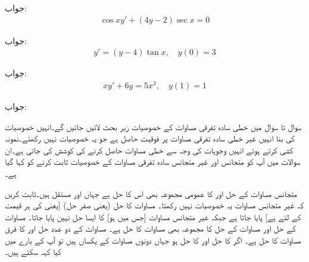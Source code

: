 جواب:
\begin{align*}
\cos x y'+(4y-2)\sec x=0
\end{align*}

جواب:
\begin{align*}
y'=(y-4)\tan x, \quad y(0)=3
\end{align*}

جواب:
\begin{align*}
xy'+6y=5x^3, \quad y(1)=1
\end{align*}

جواب:

سوال  تا سوال  میں خطی سادہ تفرقی مساوات کے خصوصیات زیر بحث لائیں جائیں گے۔انہیں خصوصیات کی بنا انہیں غیر خطی سادہ تفرقی مساوات پر فوقیت حاصل ہے جو یہ خصوصیات نہیں رکھتے۔نمونہ کشی کرتے ہوئے انہیں وجوہات کی وجہ سے خطی مساوات حاصل کرنے کی کوشش کی جاتی ہے۔ان سوالات میں آپ کو متجانس اور غیر متجانس سادہ تفرقی مساوات کے خصوصیات ثابت کرنے کو کہا گیا ہے۔



متجانس مساوات  کے حل  اور  کا عمومی مجموعہ  بھی اس کا حل ہے جہاں  اور  مستقل ہیں۔ثابت کریں کہ غیر متجانس مساوات  یہ خصوصیات نہیں رکھتا۔
مساوات  کا  حل (یعنی صفر حل)  [یعنی  کی ہر قیمت کے لئے  ہے]  پایا جاتا ہے جبکہ غیر متجانس مساوات  [جس میں  ہو] کا ایسا حل نہیں پایا جاتا۔
مساوات  کے حل  اور مساوات  کے حل  کا مجموعہ  بھی مساوات  کا حل ہے۔ 
مساوات  کے دو عدد حل  اور  کا فرق  مساوات  کا حل ہے۔ 
اگر  کا حل  اور  کا حل  ہو جہاں دونوں مساوات کے  یکساں ہیں تو آپ  کے بارے میں کیا کہہ سکتے ہیں۔

